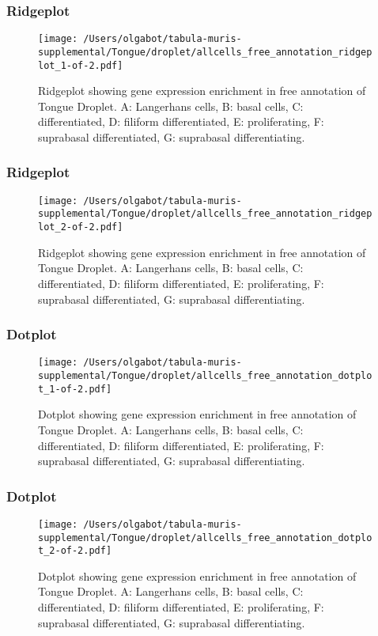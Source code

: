 \newpage
\subsubsection{Ridgeplot}
\begin{figure}[h]
\centering
\texttt{[image: /Users/olgabot/tabula-muris-supplemental/Tongue/droplet/allcells\_free\_annotation\_ridgeplot\_1-of-2.pdf]}

\caption{ Ridgeplot  showing gene expression enrichment in free annotation of Tongue Droplet. A: Langerhans cells, B: basal cells, C: differentiated, D: filiform differentiated, E: proliferating, F: suprabasal differentiated, G: suprabasal differentiating.}
\end{figure}


\newpage
\newpage
\subsubsection{Ridgeplot}
\begin{figure}[h]
\centering
\texttt{[image: /Users/olgabot/tabula-muris-supplemental/Tongue/droplet/allcells\_free\_annotation\_ridgeplot\_2-of-2.pdf]}

\caption{ Ridgeplot  showing gene expression enrichment in free annotation of Tongue Droplet. A: Langerhans cells, B: basal cells, C: differentiated, D: filiform differentiated, E: proliferating, F: suprabasal differentiated, G: suprabasal differentiating.}
\end{figure}


\newpage
\newpage
\subsubsection{Dotplot}
\begin{figure}[h]
\centering
\texttt{[image: /Users/olgabot/tabula-muris-supplemental/Tongue/droplet/allcells\_free\_annotation\_dotplot\_1-of-2.pdf]}

\caption{ Dotplot  showing gene expression enrichment in free annotation of Tongue Droplet. A: Langerhans cells, B: basal cells, C: differentiated, D: filiform differentiated, E: proliferating, F: suprabasal differentiated, G: suprabasal differentiating.}
\end{figure}


\newpage
\newpage
\subsubsection{Dotplot}
\begin{figure}[h]
\centering
\texttt{[image: /Users/olgabot/tabula-muris-supplemental/Tongue/droplet/allcells\_free\_annotation\_dotplot\_2-of-2.pdf]}

\caption{ Dotplot  showing gene expression enrichment in free annotation of Tongue Droplet. A: Langerhans cells, B: basal cells, C: differentiated, D: filiform differentiated, E: proliferating, F: suprabasal differentiated, G: suprabasal differentiating.}
\end{figure}

